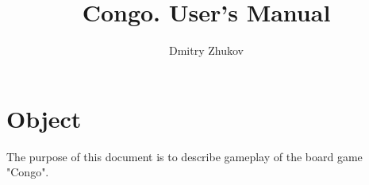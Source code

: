 \documentclass[a4paper, 11pt]{article}
\begin{document}
\title{Congo. User's Manual}
\author{Dmitry Zhukov}

\maketitle

\tableofcontents

\newpage

\section{Object}

The purpose of this document is to describe gameplay of the board game "Congo".






\end{document}
